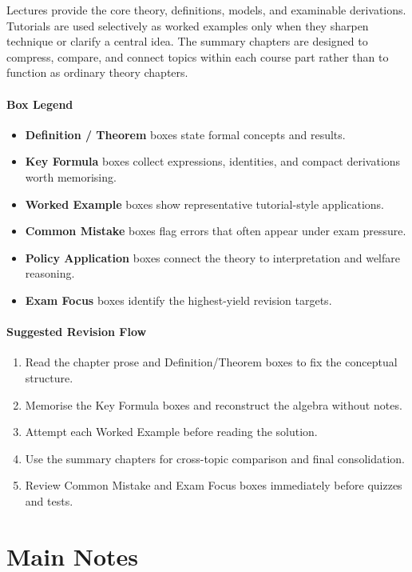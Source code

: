 \documentclass[12pt]{article}
\begin{document}
Lectures provide the core theory, definitions, models, and examinable derivations. Tutorials are used selectively as worked examples only when they sharpen technique or clarify a central idea. The summary chapters are designed to compress, compare, and connect topics within each course part rather than to function as ordinary theory chapters.

\subsection*{Box Legend}
\begin{itemize}
    \item \textbf{Definition / Theorem} boxes state formal concepts and results.
    \item \textbf{Key Formula} boxes collect expressions, identities, and compact derivations worth memorising.
    \item \textbf{Worked Example} boxes show representative tutorial-style applications.
    \item \textbf{Common Mistake} boxes flag errors that often appear under exam pressure.
    \item \textbf{Policy Application} boxes connect the theory to interpretation and welfare reasoning.
    \item \textbf{Exam Focus} boxes identify the highest-yield revision targets.
\end{itemize}

\subsection*{Suggested Revision Flow}
\begin{enumerate}
    \item Read the chapter prose and Definition/Theorem boxes to fix the conceptual structure.
    \item Memorise the Key Formula boxes and reconstruct the algebra without notes.
    \item Attempt each Worked Example before reading the solution.
    \item Use the summary chapters for cross-topic comparison and final consolidation.
    \item Review Common Mistake and Exam Focus boxes immediately before quizzes and tests.
\end{enumerate}

\newpage
\part{Main Notes}
\end{document}
